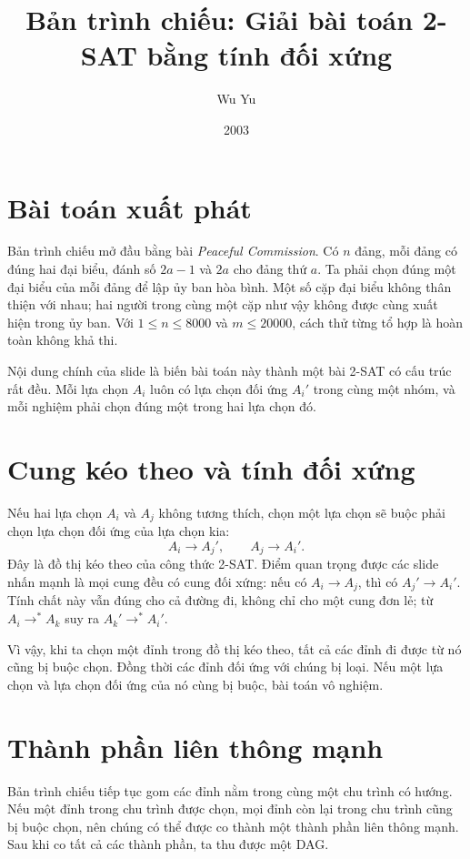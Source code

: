 \documentclass[11pt]{article}
\title{Bản trình chiếu: Giải bài toán 2-SAT bằng tính đối xứng}
\author{Wu Yu}
\date{2003}
\begin{document}
\maketitle


\section{Bài toán xuất phát}

Bản trình chiếu mở đầu bằng bài \textit{Peaceful Commission}. Có \(n\)
đảng, mỗi đảng có đúng hai đại biểu, đánh số \(2a-1\) và \(2a\) cho đảng
thứ \(a\). Ta phải chọn đúng một đại biểu của mỗi đảng để lập ủy ban hòa
bình. Một số cặp đại biểu không thân thiện với nhau; hai người trong cùng
một cặp như vậy không được cùng xuất hiện trong ủy ban. Với
\(1\le n\le 8000\) và \(m\le 20000\), cách thử từng tổ hợp là hoàn toàn
không khả thi.

Nội dung chính của slide là biến bài toán này thành một bài 2-SAT có cấu
trúc rất đều. Mỗi lựa chọn \(A_i\) luôn có lựa chọn đối ứng \(A_i'\) trong
cùng một nhóm, và mỗi nghiệm phải chọn đúng một trong hai lựa chọn đó.

\section{Cung kéo theo và tính đối xứng}

Nếu hai lựa chọn \(A_i\) và \(A_j\) không tương thích, chọn một lựa chọn sẽ
buộc phải chọn lựa chọn đối ứng của lựa chọn kia:
\[
  A_i \to A_j', \qquad A_j \to A_i'.
\]
Đây là đồ thị kéo theo của công thức 2-SAT. Điểm quan trọng được các slide
nhấn mạnh là mọi cung đều có cung đối xứng: nếu có \(A_i\to A_j\), thì có
\(A_j'\to A_i'\). Tính chất này vẫn đúng cho cả đường đi, không chỉ cho
một cung đơn lẻ; từ \(A_i\to^* A_k\) suy ra \(A_k'\to^* A_i'\).

Vì vậy, khi ta chọn một đỉnh trong đồ thị kéo theo, tất cả các đỉnh đi được
từ nó cũng bị buộc chọn. Đồng thời các đỉnh đối ứng với chúng bị loại. Nếu
một lựa chọn và lựa chọn đối ứng của nó cùng bị buộc, bài toán vô nghiệm.

\section{Thành phần liên thông mạnh}

Bản trình chiếu tiếp tục gom các đỉnh nằm trong cùng một chu trình có hướng.
Nếu một đỉnh trong chu trình được chọn, mọi đỉnh còn lại trong chu trình
cũng bị buộc chọn, nên chúng có thể được co thành một thành phần liên thông
mạnh. Sau khi co tất cả các thành phần, ta thu được một DAG.
\end{document}
